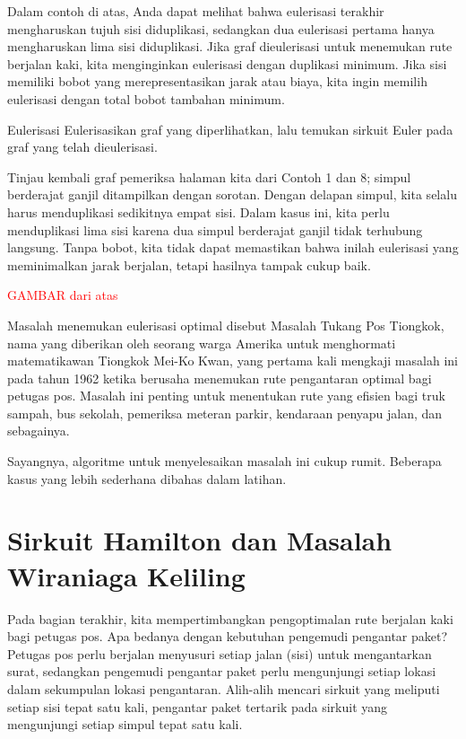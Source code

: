 Dalam contoh di atas, Anda dapat melihat bahwa eulerisasi terakhir mengharuskan tujuh sisi diduplikasi, sedangkan dua eulerisasi pertama hanya mengharuskan lima sisi diduplikasi.  Jika graf dieulerisasi untuk menemukan rute berjalan kaki, kita menginginkan eulerisasi dengan duplikasi minimum.  Jika sisi memiliki bobot yang merepresentasikan jarak atau biaya, kita ingin memilih eulerisasi dengan total bobot tambahan minimum.

\begin{ex}{Eulerisasi}{}
Eulerisasikan graf yang diperlihatkan, lalu temukan sirkuit Euler pada graf yang telah dieulerisasi.\\
\end{ex}

\begin{example}{}%
Tinjau kembali graf pemeriksa halaman kita dari Contoh 1 dan 8; simpul berderajat ganjil ditampilkan dengan sorotan.  Dengan delapan simpul, kita selalu harus menduplikasi sedikitnya empat sisi.  Dalam kasus ini, kita perlu menduplikasi lima sisi karena dua simpul berderajat ganjil tidak terhubung langsung.  Tanpa bobot, kita tidak dapat memastikan bahwa inilah eulerisasi yang meminimalkan jarak berjalan, tetapi hasilnya tampak cukup baik.

\textcolor{red}{GAMBAR dari atas}
\end{example}

Masalah menemukan eulerisasi optimal disebut Masalah Tukang Pos Tiongkok, nama yang diberikan oleh seorang warga Amerika untuk menghormati matematikawan Tiongkok Mei-Ko Kwan, yang pertama kali mengkaji masalah ini pada tahun 1962 ketika berusaha menemukan rute pengantaran optimal bagi petugas pos.   Masalah ini penting untuk menentukan rute yang efisien bagi truk sampah, bus sekolah, pemeriksa meteran parkir, kendaraan penyapu jalan, dan sebagainya.

Sayangnya, algoritme untuk menyelesaikan masalah ini cukup rumit.  Beberapa kasus yang lebih sederhana dibahas dalam latihan.

\section{Sirkuit Hamilton dan Masalah Wiraniaga Keliling}
Pada bagian terakhir, kita mempertimbangkan pengoptimalan rute berjalan kaki bagi petugas pos.  Apa bedanya dengan kebutuhan pengemudi pengantar paket?  Petugas pos perlu berjalan menyusuri setiap jalan (sisi) untuk mengantarkan surat, sedangkan pengemudi pengantar paket perlu mengunjungi setiap lokasi dalam sekumpulan lokasi pengantaran.  Alih-alih mencari sirkuit yang meliputi setiap sisi tepat satu kali, pengantar paket tertarik pada sirkuit yang mengunjungi setiap simpul tepat satu kali.

